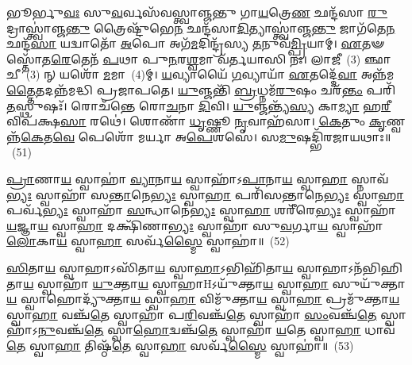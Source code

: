 𑌭𑍂𑌰𑍍𑌭𑍁\-\ul{𑌵𑌃} 𑌸𑍁\-\ul{𑌵}\-𑌰𑍍𑌵𑌸᳴𑌵𑌸𑍍𑌤𑍍𑌵𑌾𑌞𑍍𑌜𑌨𑍍𑌤𑍁 𑌗𑌾\-\ul{𑌯}\-𑌤𑍍𑌰𑍇\-\ul{𑌣} 𑌛𑌨𑍍𑌦᳴𑌸𑌾 \ul{𑌰𑍁}\-𑌦𑍍𑌰𑌾𑌸𑍍𑌤𑍍𑌵𑌾॑𑌞𑍍𑌜\-\ul{𑌨𑍍𑌤𑍁} 𑌤𑍍𑌰𑍈𑌷𑍍𑌟𑍁᳴𑌭𑍇\-\ul{𑌨} 𑌛𑌨𑍍𑌦᳴𑌸𑌾\-\ul{𑌦𑌿}\-𑌤𑍍𑌯𑌾𑌸𑍍𑌤𑍍𑌵𑌾॑𑌞𑍍𑌜\-\ul{𑌨𑍍𑌤𑍁} 𑌜𑌾𑌗᳴𑌤𑍇\-\ul{𑌨} 𑌛𑌨𑍍𑌦᳴\-\ul{𑌸𑌾} 𑌯𑌦𑍍𑌵𑌾𑌤𑍋᳴ \ul{𑌅}\-𑌪𑍋 𑌅𑌗᳴\-\ul{𑌮}\-𑌦𑌿𑌨𑍍𑌦𑍍𑌰᳴𑌸𑍍𑌯 \ul{𑌤}\-𑌨𑍁𑌵᳴\-\ul{𑌮𑍍𑌪𑍍𑌰𑌿}\-𑌯𑌾𑌮𑍍। \ul{𑌏}\-𑌤𑍟 𑌸𑍍𑌤𑍋᳴𑌤\-\ul{𑌰𑍇}\-𑌤𑍇𑌨᳴ \ul{𑌪}\-𑌥𑌾 𑌪𑍁\-\ul{𑌨}\-𑌰\-\ul{𑌶𑍍𑌵}\-𑌮𑌾 𑌵᳴𑌰𑍍𑌤𑌯𑌾𑌸𑌿 𑌨𑌃। 𑌲𑌾𑌜𑍀~(3) 𑌞𑍍𑌛𑌾𑌚𑍀~(3) 𑌨𑍍 𑌯𑌶𑍋᳴ \ul{𑌮}\-𑌮𑌾~(4)𑌮𑍍। \ul{𑌯}\-𑌵𑍍𑌯𑌾𑌯𑍈᳴ \ul{𑌗}\-𑌵𑍍𑌯𑌾𑌯𑌾᳴ \ul{𑌏}\-𑌤𑌦𑍍𑌦𑍇᳴\-\ul{𑌵𑌾} 𑌅𑌨𑍍𑌨᳴𑌮\-\ul{𑌤𑍍𑌤𑍈}\-𑌤𑌦𑌨𑍍𑌨᳴𑌮𑌦𑍍𑌧𑌿 𑌪𑍍𑌰𑌜𑌾𑌪𑌤𑍇। \ul{𑌯𑍁}\-𑌞𑍍𑌜𑌨𑍍𑌤𑌿᳴ \ul{𑌬𑍍𑌰}\-𑌧𑍍𑌨𑌮᳴\-\ul{𑌰𑍁}\-𑌷𑌂 𑌚𑌰᳴\-\ul{𑌨𑍍𑌤𑌂} 𑌪𑌰𑌿᳴ \ul{𑌤}\-𑌸𑍍𑌥𑍁𑌷𑌃᳴। 𑌰𑍋𑌚᳴𑌨𑍍𑌤𑍇 𑌰𑍋\-\ul{𑌚}\-𑌨𑌾 \ul{𑌦𑌿}\-𑌵𑌿। \ul{𑌯𑍁}\-𑌞𑍍𑌜𑌨𑍍𑌤𑍍𑌯᳴\-\ul{𑌸𑍍𑌯} 𑌕𑌾\-\ul{𑌮𑍍𑌯𑌾} 𑌹\-\ul{𑌰𑍀} 𑌵𑌿𑌪᳴𑌕𑍍𑌷\-\ul{𑌸𑌾} 𑌰𑌥𑍇॑। 𑌶𑍋𑌣𑌾᳴ \ul{𑌧𑍃}\-𑌷𑍍𑌣𑍂 \ul{𑌨𑍃}\-𑌵𑌾𑌹᳴𑌸𑌾। \ul{𑌕𑍇}\-𑌤𑍁𑌂 \ul{𑌕𑍃}\-𑌣𑍍𑌵𑌨𑍍𑌨᳴\-\ul{𑌕𑍇}\-𑌤\-\ul{𑌵𑍇} 𑌪𑍇𑌶𑍋᳴ 𑌮𑌰𑍍𑌯𑌾 𑌅\-\ul{𑌪𑍇}\-𑌶𑌸𑍇॑। 𑌸\-\ul{𑌮𑍁}\-𑌷𑌦𑍍𑌭𑌿᳴𑌰𑌜𑌾𑌯𑌥𑌾𑌃॥~(51)

{\anuvakamend[{\-\ul{𑌬𑍍𑌰}\-𑌧𑍍𑌨𑌂 𑌪𑌞𑍍𑌚᳴𑌵𑌿𑍞𑌶𑌤𑌿𑌶𑍍𑌚}]}%

\-\ul{𑌪𑍍𑌰𑌾}\-𑌣𑌾\-\ul{𑌯} 𑌸𑍍𑌵𑌾𑌹𑌾॑ \ul{𑌵𑍍𑌯𑌾}\-𑌨𑌾\-\ul{𑌯} 𑌸𑍍𑌵𑌾𑌹𑌾᳴\-𑌽\-\ul{𑌪𑌾}\-𑌨𑌾\-\ul{𑌯} 𑌸𑍍𑌵𑌾\-\ul{𑌹𑌾} 𑌸𑍍𑌨𑌾𑌵᳴\-\ul{𑌭𑍍𑌯𑌃} 𑌸𑍍𑌵𑌾𑌹𑌾᳴ 𑌸\-\ul{𑌨𑍍𑌤𑌾}\-𑌨𑍇\-\ul{𑌭𑍍𑌯𑌃} 𑌸𑍍𑌵𑌾\-\ul{𑌹𑌾} 𑌪𑌰𑌿᳴𑌸𑌨𑍍𑌤𑌾𑌨𑍇\-\ul{𑌭𑍍𑌯𑌃} 𑌸𑍍𑌵𑌾\-\ul{𑌹𑌾} 𑌪𑌰𑍍𑌵᳴\-\ul{𑌭𑍍𑌯𑌃} 𑌸𑍍𑌵𑌾𑌹𑌾᳴ \ul{𑌸}\-𑌨𑍍𑌧𑌾𑌨𑍇॑\-\ul{𑌭𑍍𑌯𑌃} 𑌸𑍍𑌵𑌾\-\ul{𑌹𑌾} 𑌶𑌰𑍀᳴𑌰𑍇\-\ul{𑌭𑍍𑌯𑌃} 𑌸𑍍𑌵𑌾𑌹𑌾᳴ \ul{𑌯}\-𑌜𑍍𑌞𑌾\-\ul{𑌯} 𑌸𑍍𑌵𑌾\-\ul{𑌹𑌾} 𑌦𑌕𑍍𑌷𑌿᳴𑌣𑌾\-\ul{𑌭𑍍𑌯𑌃} 𑌸𑍍𑌵𑌾𑌹𑌾᳴ 𑌸𑍁\-\ul{𑌵}\-𑌰𑍍𑌗𑌾\-\ul{𑌯} 𑌸𑍍𑌵𑌾𑌹𑌾᳴ \ul{𑌲𑍋}\-𑌕𑌾\-\ul{𑌯} 𑌸𑍍𑌵𑌾\-\ul{𑌹𑌾} 𑌸𑌰𑍍𑌵᳴\-\ul{𑌸𑍍𑌮𑍈} 𑌸𑍍𑌵𑌾𑌹𑌾॑॥~(52)

{\anuvakamend[{\-\ul{𑌪𑍍𑌰𑌾}\-𑌣𑌾\-\ul{𑌯𑌾}\-𑌷𑍍𑌟𑌾𑌵𑌿𑍞᳴𑌶𑌤𑌿𑌃}]}%

\-\ul{𑌸𑌿}\-𑌤𑌾\-\ul{𑌯} 𑌸𑍍𑌵𑌾𑌹𑌾\-𑌽𑌸𑌿᳴𑌤𑌾\-\ul{𑌯} 𑌸𑍍𑌵𑌾\-\ul{𑌹𑌾}\-\-𑌽𑌭𑌿𑌹𑌿᳴𑌤𑌾\-\ul{𑌯} 𑌸𑍍𑌵𑌾𑌹𑌾\-𑌽𑌨᳴𑌭𑌿𑌹𑌿𑌤𑌾\-\ul{𑌯} 𑌸𑍍𑌵𑌾𑌹𑌾᳴ \ul{𑌯𑍁}\-𑌕𑍍𑌤𑌾\-\ul{𑌯} 𑌸𑍍𑌵𑌾𑌹𑌾H\-𑌽𑌯𑍁᳴𑌕𑍍𑌤𑌾\-\ul{𑌯} 𑌸𑍍𑌵𑌾\-\ul{𑌹𑌾} 𑌸𑍁𑌯𑍁᳴𑌕𑍍𑌤𑌾\-\ul{𑌯} 𑌸𑍍𑌵𑌾𑌹𑍋𑌦𑍍𑌯𑍁᳴𑌕𑍍𑌤𑌾\-\ul{𑌯} 𑌸𑍍𑌵𑌾\-\ul{𑌹𑌾} 𑌵𑌿𑌮𑍁᳴𑌕𑍍𑌤𑌾\-\ul{𑌯} 𑌸𑍍𑌵𑌾\-\ul{𑌹𑌾} 𑌪𑍍𑌰𑌮𑍁᳴𑌕𑍍𑌤𑌾\-\ul{𑌯} 𑌸𑍍𑌵𑌾\-\ul{𑌹𑌾} 𑌵𑌞𑍍𑌚᳴\-\ul{𑌤𑍇} 𑌸𑍍𑌵𑌾𑌹𑌾᳴ 𑌪\-\ul{𑌰𑌿}\-𑌵𑌞𑍍𑌚᳴\-\ul{𑌤𑍇} 𑌸𑍍𑌵𑌾𑌹𑌾᳴ \ul{𑌸𑌂}\-𑌵𑌞𑍍𑌚᳴\-\ul{𑌤𑍇} 𑌸𑍍𑌵𑌾𑌹𑌾᳴\-𑌽\-\ul{𑌨𑍁}\-𑌵𑌞𑍍𑌚᳴\-\ul{𑌤𑍇} 𑌸𑍍𑌵𑌾\-\ul{𑌹𑍋}\-𑌦𑍍𑌵𑌞𑍍𑌚᳴\-\ul{𑌤𑍇} 𑌸𑍍𑌵𑌾𑌹𑌾᳴ \ul{𑌯}\-𑌤𑍇 𑌸𑍍𑌵𑌾\-\ul{𑌹𑌾} 𑌧𑌾𑌵᳴\-\ul{𑌤𑍇} 𑌸𑍍𑌵𑌾\-\ul{𑌹𑌾} 𑌤𑌿𑌷𑍍𑌠᳴\-\ul{𑌤𑍇} 𑌸𑍍𑌵𑌾\-\ul{𑌹𑌾} 𑌸𑌰𑍍𑌵᳴\-\ul{𑌸𑍍𑌮𑍈} 𑌸𑍍𑌵𑌾𑌹𑌾॑॥~(53)

{\anuvakamend[{\-\ul{𑌸𑌿}\-𑌤𑌾\-\ul{𑌯𑌾}\-𑌷𑍍𑌟𑌾𑌤𑍍𑌰𑌿𑍞᳴𑌶𑌤𑍍}]}%

